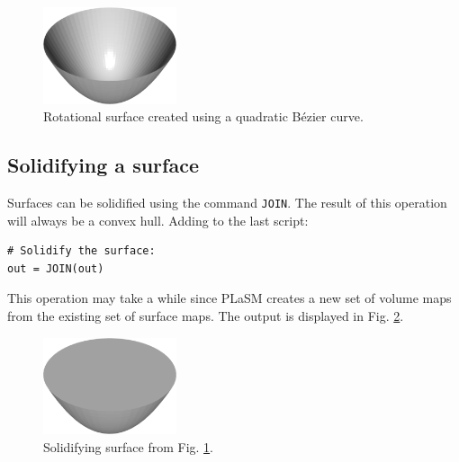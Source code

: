 \begin{figure}[!ht]
\begin{center}
\includegraphics[width=0.35\textwidth]{img/curves-4.png}
\end{center}
\vspace{-4mm}
\caption{Rotational surface created using a quadratic B\'ezier curve.}
\label{fig:curves-4}
\end{figure}

\subsection{Solidifying a surface}

Surfaces can be solidified using the command {\tt JOIN}. The 
result of this operation will always be a convex hull. 
Adding to the last script:\\

\begin{bbox}
\begin{verbatim}
# Solidify the surface:
out = JOIN(out)
\end{verbatim}
\end{bbox}
\vspace{6mm}

\noindent
This operation may take a while since PLaSM creates a new 
set of volume maps from the existing set of surface maps. 
The output is displayed in Fig. \ref{fig:curves-5}.

\begin{figure}[!ht]
\begin{center}
\includegraphics[width=0.35\textwidth]{img/curves-5.png}
\end{center}
\vspace{-4mm}
\caption{Solidifying surface from Fig. \ref{fig:curves-4}.}
\label{fig:curves-5}
\vspace{-1cm}
\end{figure}
\newpage

